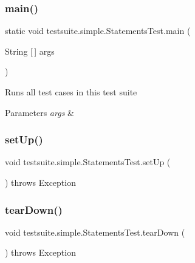 \subsubsection{\texorpdfstring{main()}{main()}}
{\footnotesize\ttfamily static void testsuite.\+simple.\+Statements\+Test.\+main (\begin{DoxyParamCaption}\item[{String \mbox{[}$\,$\mbox{]}}]{args }\end{DoxyParamCaption})\hspace{0.3cm}{\ttfamily [static]}}

Runs all test cases in this test suite


\begin{DoxyParams}{Parameters}
{\em args} & \\
\hline
\end{DoxyParams}
\mbox{\label{classtestsuite_1_1simple_1_1_statements_test_a49ab77bad20dc259d9978a4f3566f2ae}} 
\subsubsection{\texorpdfstring{set\+Up()}{setUp()}}
{\footnotesize\ttfamily void testsuite.\+simple.\+Statements\+Test.\+set\+Up (\begin{DoxyParamCaption}{ }\end{DoxyParamCaption}) throws Exception}

\mbox{\label{classtestsuite_1_1simple_1_1_statements_test_a99769a3bf4c9af2e19ac153633177043}} 
\subsubsection{\texorpdfstring{tear\+Down()}{tearDown()}}
{\footnotesize\ttfamily void testsuite.\+simple.\+Statements\+Test.\+tear\+Down (\begin{DoxyParamCaption}{ }\end{DoxyParamCaption}) throws Exception}

